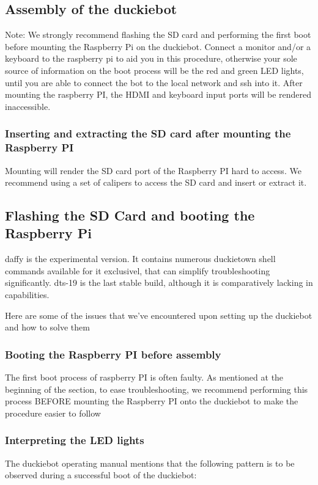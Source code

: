 \documentclass[12pt]{article}
\begin{document}
\subsection{Assembly of the duckiebot}

Note: We strongly recommend flashing the SD card and performing the first boot before mounting the Raspberry Pi on the duckiebot. Connect a monitor and/or a keyboard to the raspberry pi to aid you in this procedure, otherwise your sole source of information on the boot process will be the red and green LED lights, until you are able to connect the bot to the local network and ssh into it. After mounting the raspberry PI, the HDMI and keyboard input ports will be rendered inaccessible.

\subsubsection{Inserting and extracting the SD card after mounting the Raspberry PI}

Mounting will render the SD card port of the Raspberry PI hard to access. We recommend using a set of calipers to access the SD card and insert or extract it.


\subsection{Flashing the SD Card and booting the Raspberry Pi}

daffy is the experimental version. It contains numerous duckietown shell commands available for it exclusivel, that can simplify troubleshooting significantly. dts-19 is the last stable build, although it is comparatively lacking in capabilities.

Here are some of the issues that we've encountered upon setting up the duckiebot and how to solve them

\subsubsection{Booting the Raspberry PI before assembly}

The first boot process of raspberry PI is often faulty. As mentioned at the beginning of the section, to ease troubleshooting, we recommend performing this process BEFORE mounting the Raspberry PI onto the duckiebot to make the procedure easier to follow
\subsubsection{Interpreting the LED lights}
The duckiebot operating manual mentions that the following pattern is to be observed during a successful boot of the duckiebot:
\end{document}
